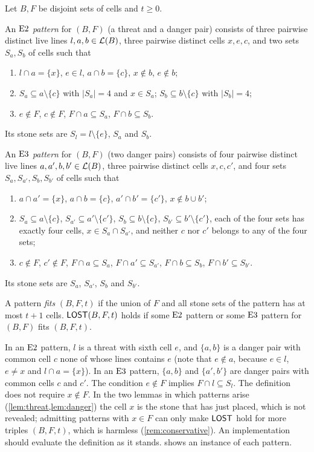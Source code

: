 \begin{definition}\label{def:lost}
Let $B,F$ be disjoint sets of cells and $t\ge 0$.

An \emph{$\mathrm{E2}$ pattern} for $(B,F)$ (a threat and a danger pair) consists of three pairwise distinct live
lines $l,a,b\in\mathcal{L}(B)$, three pairwise distinct cells $x,e,c$, and two sets $S_a,S_b$ of cells such that
\begin{enumerate}[label=\textup{(E2.\arabic*)},leftmargin=3.6em]
\item $l\cap a=\{x\}$, $e\in l$, $a\cap b=\{c\}$, $x\notin b$, $e\notin b$;
\item $S_a\subseteq a\setminus\{c\}$ with $|S_a|=4$ and $x\in S_a$; $S_b\subseteq b\setminus\{c\}$ with $|S_b|=4$;
\item $e\notin F$, $c\notin F$, $F\cap a\subseteq S_a$, $F\cap b\subseteq S_b$.
\end{enumerate}
Its stone sets are $S_l=l\setminus\{e\}$, $S_a$ and $S_b$.

An \emph{$\mathrm{E3}$ pattern} for $(B,F)$ (two danger pairs) consists of four pairwise distinct live lines
$a,a',b,b'\in\mathcal{L}(B)$, three pairwise distinct cells $x,c,c'$, and four sets $S_a,S_{a'},S_b,S_{b'}$ of cells
such that
\begin{enumerate}[label=\textup{(E3.\arabic*)},leftmargin=3.6em]
\item $a\cap a'=\{x\}$, $a\cap b=\{c\}$, $a'\cap b'=\{c'\}$, $x\notin b\cup b'$;
\item $S_a\subseteq a\setminus\{c\}$, $S_{a'}\subseteq a'\setminus\{c'\}$, $S_b\subseteq b\setminus\{c\}$,
  $S_{b'}\subseteq b'\setminus\{c'\}$, each of the four sets has exactly four cells, $x\in S_a\cap S_{a'}$,
  and neither $c$ nor $c'$ belongs to any of the four sets;
\item $c\notin F$, $c'\notin F$, $F\cap a\subseteq S_a$, $F\cap a'\subseteq S_{a'}$, $F\cap b\subseteq S_b$,
  $F\cap b'\subseteq S_{b'}$.
\end{enumerate}
Its stone sets are $S_a$, $S_{a'}$, $S_b$ and $S_{b'}$.

A pattern \emph{fits} $(B,F,t)$ if the union of $F$ and all stone sets of the pattern has at most $t+1$ cells.
$\mathsf{LOST}(B,F,t)$ holds if some $\mathrm{E2}$ pattern or some $\mathrm{E3}$ pattern for $(B,F)$ fits $(B,F,t)$.
\end{definition}

In an $\mathrm{E2}$ pattern, $l$ is a threat with sixth cell $e$, and $\{a,b\}$ is a danger pair with common cell
$c$ none of whose lines contains $e$ (note that $e\notin a$, because $e\in l$, $e\ne x$ and
$l\cap a=\{x\}$). In an $\mathrm{E3}$ pattern, $\{a,b\}$ and $\{a',b'\}$ are danger pairs with common cells $c$
and $c'$. The condition $e\notin F$ implies $F\cap l\subseteq S_l$. The definition does not require
$x\notin F$. In the two lemmas in which patterns arise (\cref{lem:threat,lem:danger}) the cell $x$ is the stone
that \Maker{} has just placed, which is not revealed; admitting patterns with $x\in F$ can only make $\mathsf{LOST}$
hold for more triples $(B,F,t)$, which is harmless (\cref{rem:conservative}). An implementation should
evaluate the definition as it stands.  shows an instance of each pattern.

